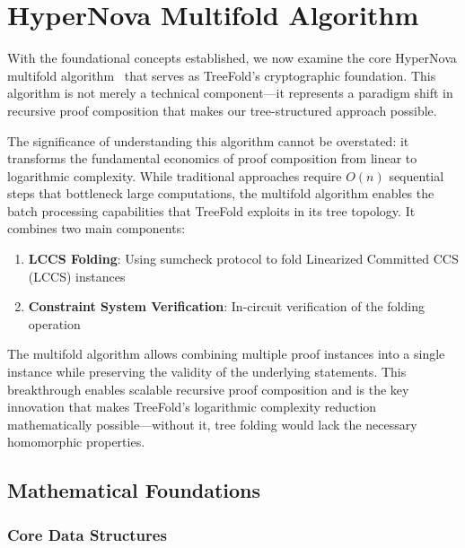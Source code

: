 \documentclass[11pt,a4paper]{article}
\theoremstyle{plain}
\theoremstyle{definition}
\begin{document}
\section{HyperNova Multifold Algorithm}

With the foundational concepts established, we now examine the core HyperNova multifold algorithm~\cite{hypernova} that serves as TreeFold's cryptographic foundation. This algorithm is not merely a technical component—it represents a paradigm shift in recursive proof composition that makes our tree-structured approach possible.

The significance of understanding this algorithm cannot be overstated: it transforms the fundamental economics of proof composition from linear to logarithmic complexity. While traditional approaches require $O(n)$ sequential steps that bottleneck large computations, the multifold algorithm enables the batch processing capabilities that TreeFold exploits in its tree topology. It combines two main components:

\begin{enumerate}[itemsep=5pt]
  \item \textbf{LCCS Folding}: Using sumcheck protocol to fold Linearized Committed CCS (LCCS) instances
  \item \textbf{Constraint System Verification}: In-circuit verification of the folding operation
\end{enumerate}

\begin{keypoint}
The multifold algorithm allows combining multiple proof instances into a single instance while preserving the validity of the underlying statements. This breakthrough enables scalable recursive proof composition and is the key innovation that makes TreeFold's logarithmic complexity reduction mathematically possible—without it, tree folding would lack the necessary homomorphic properties.
\end{keypoint}

\subsection{Mathematical Foundations}

\subsubsection{Core Data Structures}
\end{document}
